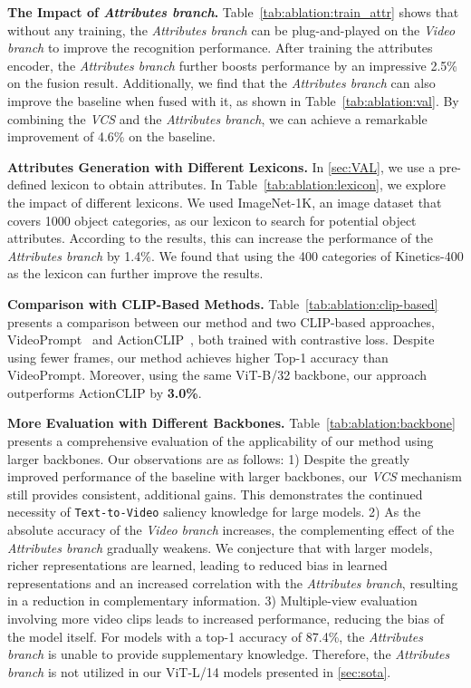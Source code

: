\documentclass[10pt,twocolumn,letterpaper]{article}
\begin{document}
\noindent\textbf{The Impact of \emph{Attributes branch}.} 
Table~\ref{tab:ablation:train_attr} shows that without any training, the \emph{Attributes branch} can be plug-and-played on the \emph{Video branch} to improve the recognition performance.
After training the attributes encoder, the \emph{Attributes branch} further boosts performance by an impressive 2.5\% on the fusion result. Additionally, we find that the \emph{Attributes branch} can also improve the baseline when fused with it, as shown in Table~\ref{tab:ablation:val}. By combining the \emph{VCS} and the \emph{Attributes branch}, we can achieve a remarkable improvement of 4.6\% on the baseline.


\noindent\textbf{Attributes Generation with Different Lexicons.}
In \cref{sec:VAL}, we use a pre-defined lexicon to obtain attributes. In Table~\ref{tab:ablation:lexicon}, we explore the impact of different lexicons. We used ImageNet-1K, an image dataset that covers 1000 object categories, as our lexicon to search for potential object attributes. According to the results, this can increase the performance of the \emph{Attributes branch} by 1.4\%. We found that using the 400 categories of Kinetics-400 as the lexicon can further improve the results.

\noindent\textbf{Comparison with CLIP-Based Methods.}
Table~\ref{tab:ablation:clip-based} presents a comparison between our method and two CLIP-based approaches, VideoPrompt~\cite{ju2022prompting} and ActionCLIP~\cite{wang2021actionclip}, both trained with contrastive loss.
Despite using fewer frames, our method achieves higher Top-1 accuracy than VideoPrompt. Moreover, using the same ViT-B/32 backbone, our approach outperforms ActionCLIP by \textbf{3.0\%}.

\noindent\textbf{More Evaluation with Different Backbones.} 
Table~\ref{tab:ablation:backbone} presents a comprehensive evaluation of the applicability of our method using larger backbones. Our observations are as follows:
1) Despite the greatly improved performance of the baseline with larger backbones, our \emph{VCS} mechanism still provides consistent, additional gains. This demonstrates the continued necessity of \texttt{Text-to-Video} saliency knowledge for large models.
2) As the absolute accuracy of the \emph{Video branch} increases, the complementing effect of the \emph{Attributes branch} gradually weakens. We conjecture that with larger models, richer representations are learned, leading to reduced bias in learned representations and an increased correlation with the \emph{Attributes branch}, resulting in a reduction in complementary information.
3) Multiple-view evaluation involving more video clips leads to increased performance, reducing the bias of the model itself. For models with a top-1 accuracy of 87.4\%, the \emph{Attributes branch} is unable to provide supplementary knowledge. Therefore, the \emph{Attributes branch} is not utilized in our ViT-L/14 models presented in \cref{sec:sota}.
\end{document}
